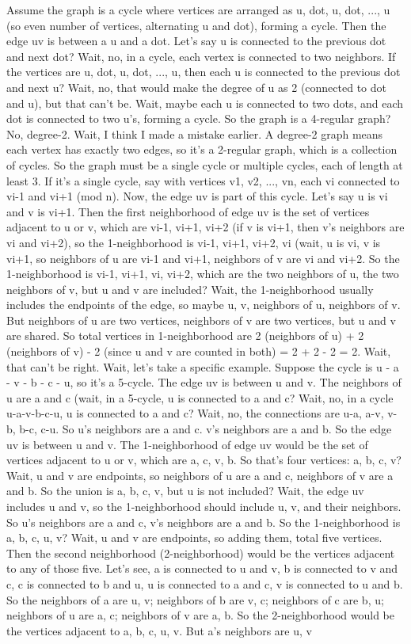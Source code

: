 {Assume the graph is a cycle where vertices are arranged as u, dot, u, dot, ..., u (so even number of vertices, alternating u and dot), forming a cycle. Then the edge uv is between a u and a dot. Let's say u is connected to the previous dot and next dot? Wait, no, in a cycle, each vertex is connected to two neighbors. If the vertices are u, dot, u, dot, ..., u, then each u is connected to the previous dot and next u? Wait, no, that would make the degree of u as 2 (connected to dot and u), but that can't be. Wait, maybe each u is connected to two dots, and each dot is connected to two u's, forming a cycle. So the graph is a 4-regular graph? No, degree-2. Wait, I think I made a mistake earlier. A degree-2 graph means each vertex has exactly two edges, so it's a 2-regular graph, which is a collection of cycles. So the graph must be a single cycle or multiple cycles, each of length at least 3. If it's a single cycle, say with vertices v1, v2, ..., vn, each vi connected to vi-1 and vi+1 (mod n). Now, the edge uv is part of this cycle. Let's say u is vi and v is vi+1. Then the first neighborhood of edge uv is the set of vertices adjacent to u or v, which are vi-1, vi+1, vi+2 (if v is vi+1, then v's neighbors are vi and vi+2), so the 1-neighborhood is {vi-1, vi+1, vi+2, vi} (wait, u is vi, v is vi+1, so neighbors of u are vi-1 and vi+1, neighbors of v are vi and vi+2. So the 1-neighborhood is {vi-1, vi+1, vi, vi+2}, which are the two neighbors of u, the two neighbors of v, but u and v are included? Wait, the 1-neighborhood usually includes the endpoints of the edge, so maybe {u, v, neighbors of u, neighbors of v}. But neighbors of u are two vertices, neighbors of v are two vertices, but u and v are shared. So total vertices in 1-neighborhood are 2 (neighbors of u) + 2 (neighbors of v) - 2 (since u and v are counted in both) = 2 + 2 - 2 = 2. Wait, that can't be right. Wait, let's take a specific example. Suppose the cycle is u - a - v - b - c - u, so it's a 5-cycle. The edge uv is between u and v. The neighbors of u are a and c (wait, in a 5-cycle, u is connected to a and c? Wait, no, in a cycle u-a-v-b-c-u, u is connected to a and c? Wait, no, the connections are u-a, a-v, v-b, b-c, c-u. So u's neighbors are a and c. v's neighbors are a and b. So the edge uv is between u and v. The 1-neighborhood of edge uv would be the set of vertices adjacent to u or v, which are a, c, v, b. So that's four vertices: a, b, c, v? Wait, u and v are endpoints, so neighbors of u are a and c, neighbors of v are a and b. So the union is {a, b, c, v}, but u is not included? Wait, the edge uv includes u and v, so the 1-neighborhood should include u, v, and their neighbors. So u's neighbors are a and c, v's neighbors are a and b. So the 1-neighborhood is {a, b, c, u, v}? Wait, u and v are endpoints, so adding them, total five vertices. Then the second neighborhood (2-neighborhood) would be the vertices adjacent to any of those five. Let's see, a is connected to u and v, b is connected to v and c, c is connected to b and u, u is connected to a and c, v is connected to u and b. So the neighbors of a are u, v; neighbors of b are v, c; neighbors of c are b, u; neighbors of u are a, c; neighbors of v are a, b. So the 2-neighborhood would be the vertices adjacent to a, b, c, u, v. But a's neighbors are u, v }
